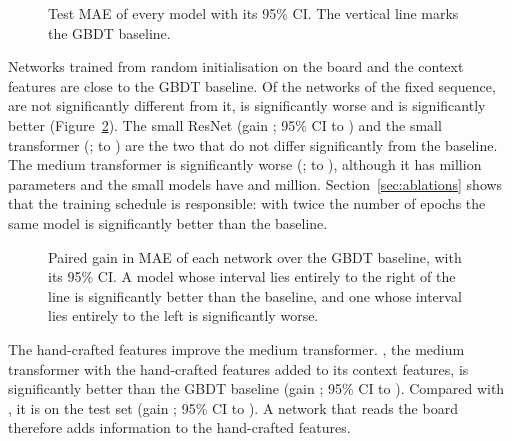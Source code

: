 \documentclass[11pt]{article}
\begin{document}
\begin{figure}[htbp]\centering
{}
\caption{Test MAE of every model with its 95\% CI. The vertical line marks
the GBDT baseline.}
\label{fig:scores}
\end{figure}

Networks trained from random initialisation on the board and the context
features are close to the GBDT baseline. Of the  networks of
the fixed sequence,  are not significantly different from it,
 is significantly worse and  is
significantly better (Figure~\ref{fig:gains}). The small ResNet (gain
; 95\% CI  to
) and the small transformer
(;  to
) are the two that do not differ
significantly from the baseline. The medium transformer is significantly
worse (; 
to ), although it has
 million parameters and the
small models have  and
 million.\ifchangeepochs{}
Section~\ref{sec:ablations} shows that the training schedule is responsible:
with twice the number of epochs the same model is significantly better than
the baseline.\fi

\begin{figure}[htbp]\centering
{}
\caption{Paired gain in MAE of each network over the GBDT baseline, with its
95\% CI. A model whose interval lies entirely to the right of the line is
significantly better than the baseline, and one whose interval lies entirely
to the left is significantly worse.}
\label{fig:gains}
\end{figure}

The hand-crafted features improve the medium transformer.
, the medium transformer with the hand-crafted
features added to its context features, is significantly better than the
GBDT baseline (gain ; 95\% CI
 to
).
\ifpairs
Compared with , it is
 on the test set
(gain ; 95\% CI
 to
).
\fi
A network that reads the board therefore adds information to the hand-crafted
features.
\end{document}

